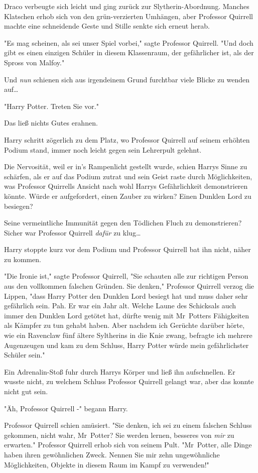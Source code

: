 {Draco verbeugte sich leicht und ging zurück zur Slytherin-Abordnung. Manches Klatschen erhob sich von den grün-verzierten Umhängen, aber Professor Quirrell machte eine schneidende Geste und Stille senkte sich erneut herab.

"Es mag scheinen, als sei unser Spiel vorbei," sagte Professor Quirrell. "Und doch gibt es einen einzigen Schüler in diesem Klassenraum, der gefährlicher ist, als der Spross von Malfoy."

Und \emph{nun} schienen sich aus irgendeinem Grund furchtbar viele Blicke zu wenden auf…

"Harry Potter. Treten Sie vor."

Das ließ nichts Gutes erahnen.

Harry schritt zögerlich zu dem Platz, wo Professor Quirrell auf seinem erhöhten Podium stand, immer noch leicht gegen sein Lehrerpult gelehnt.

Die Nervosität, weil er in's Rampenlicht gestellt wurde, schien Harrys Sinne zu schärfen, als er auf das Podium zutrat und sein Geist raste durch Möglichkeiten, was Professor Quirrells Ansicht nach wohl Harrys Gefährlichkeit demonstrieren könnte. Würde er aufgefordert, einen Zauber zu wirken? Einen Dunklen Lord zu besiegen?

Seine vermeintliche Immunität gegen den Tödlichen Fluch zu demonstrieren? Sicher war Professor Quirrell \emph{dafür} zu klug…

Harry stoppte kurz vor dem Podium und Professor Quirrell bat ihn nicht, näher zu kommen.

"Die Ironie ist," sagte Professor Quirrell, "Sie schauten alle zur richtigen Person aus den vollkommen falschen Gründen. Sie denken," Professor Quirrell verzog die Lippen, "dass Harry Potter den Dunklen Lord besiegt hat und muss daher sehr gefährlich sein. Pah. Er war ein Jahr alt. Welche Laune des Schicksals auch immer den Dunklen Lord getötet hat, dürfte wenig mit Mr~Potters Fähigkeiten als Kämpfer zu tun gehabt haben. Aber nachdem ich Gerüchte darüber hörte, wie ein Ravenclaw fünf ältere Syltherins in die Knie zwang, befragte ich mehrere Augenzeugen und kam zu dem Schluss, Harry Potter würde mein gefährlichster Schüler sein."

Ein Adrenalin-Stoß fuhr durch Harrys Körper und ließ ihn aufschnellen. Er wusste nicht, zu welchem Schluss Professor Quirrell gelangt war, aber das konnte nicht gut sein.

"Äh, Professor Quirrell -" begann Harry.

Professor Quirrell schien amüsiert. "Sie denken, ich sei zu einem falschen Schluss gekommen, nicht wahr, Mr~Potter? Sie werden lernen, besseres von \emph{mir} zu erwarten." Professor Quirrell erhob sich von seinem Pult. "Mr~Potter, alle Dinge haben ihren gewöhnlichen Zweck. Nennen Sie mir zehn ungewöhnliche Möglichkeiten, Objekte in diesem Raum im Kampf zu verwenden!"

}
